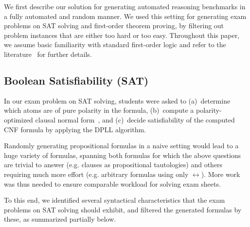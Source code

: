 We first describe our solution for generating automated reasoning
benchmarks in a fully automated and random manner. We used this
setting for generating exam problems on SAT solving and first-order
theorem proving, by 
filtering out problem instances that are either too
hard or too easy. Throughout this paper, we assume basic familiarity with standard first-order
logic and refer to the literature~\cite{SAT09,Vampire13} for further details.


\subsection{Boolean Satisfiability (SAT)}\label{sec:sat}

In our exam problem on SAT solving, students were asked to
(a)~determine which atoms are of pure polarity in the formula,
(b)~compute a polarity-optimized clausal normal form~\cite{Tseytin70},
and (c)~decide satisfiability of the computed CNF formula by applying the DPLL algorithm.

Randomly generating propositional formulas in a naive setting would lead
to a huge variety of formulas,
spanning both formulas for which the above questions %
are trivial to answer (e.g. clauses as propositional tautologies)
and others requiring much more effort
(e.g. arbitrary formulas using only $\leftrightarrow$).
More work was thus needed to
ensure comparable workload for solving exam sheets.

To this end,
we identified several  syntactical characteristics that the exam problems on SAT solving should exhibit,
and filtered the generated formulas by these, as summarized  partially
below. \smallskip
%

